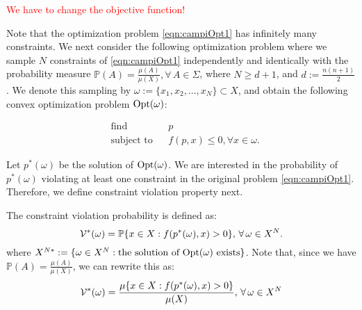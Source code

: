 \textcolor{red}{We have to change the objective function!}



Note that the optimization problem \eqref{eqn:campiOpt1} has infinitely many constraints. We next consider the following optimization problem where we sample $N$ constraints of \eqref{eqn:campiOpt1} independently and identically with the probability measure
$\mathbb{P}(A) = \frac{\mu(A)}{\mu(X)}, \forall\, A \in \Sigma$, where $N \geq d+1$, and $d := \frac{n(n+1)}{2}$. We denote this sampling by $\omega:=\{x_1, x_2, \ldots, x_N\} \subset X$, and obtain the following convex optimization problem $\text{Opt}(\omega)$: 

\begin{equation}
\label{eqn:campiOpt2}
\begin{aligned}
& \text{find} & & p \\
& \text{subject to} 
& & f(p, x) \leq 0, \forall x \in \omega. \end{aligned}
\end{equation}

Let $p^*(\omega)$ be the solution of $\text{Opt}(\omega)$. We are interested in the probability of $p^*(\omega)$ violating at least one constraint in the original problem \eqref{eqn:campiOpt1}. Therefore, we define constraint violation property next.

\begin{definition} The constraint violation probability is defined as:
\begin{equation*}
\mathcal{V}^*(\omega)=
      \mathbb{P}\{x \in X: f(p^*(\omega), x) > 0\},\, \forall\, \omega \in X^N.
\end{equation*}
where $X^{N*}:=\{\omega \in X^N: \text{the solution of $\text{Opt}(\omega)$ exists}\}$. 
Note that, since we have $\mathbb{P}(A) = \frac{\mu(A)}{\mu(X)}$, we can rewrite this as:
\begin{equation*}
\mathcal{V}^*(\omega)=
      \frac{\mu\{x \in X: f(p^*(\omega), x) > 0\}}{\mu(X)},\, \forall\, \omega \in X^N
\end{equation*}
\end{definition}

